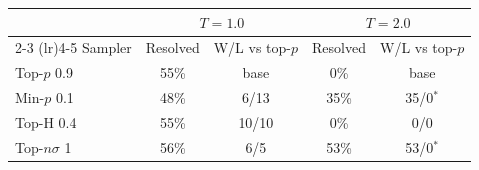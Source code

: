 \begin{tabular}{lcccc}
\toprule
 & \multicolumn{2}{c}{$T{=}1.0$} & \multicolumn{2}{c}{$T{=}2.0$} \\
\cmidrule(lr){2-3} \cmidrule(lr){4-5}
Sampler & Resolved & W/L vs top-$p$ & Resolved & W/L vs top-$p$ \\
\midrule
Top-$p$ 0.9 & 55\% & base & 0\% & base \\
Min-$p$ 0.1 & 48\% & 6/13 & 35\% & 35/0$^{*}$ \\
Top-H 0.4 & 55\% & 10/10 & 0\% & 0/0 \\
Top-$n\sigma$ 1 & 56\% & 6/5 & 53\% & 53/0$^{*}$ \\
\bottomrule
\end{tabular}
